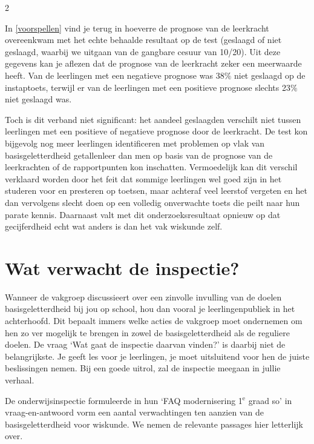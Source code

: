 \begin{multicols}{2}

In \autoref{voorspellen} vind je terug in hoeverre de prognose van de leerkracht overeenkwam met het echte behaalde resultaat op de test (geslaagd of niet geslaagd, waarbij we uitgaan van de gangbare cesuur van 10/20). Uit deze gegevens kan je aflezen dat de prognose van de leerkracht zeker een meerwaarde heeft. Van de leerlingen met een negatieve prognose was 38$\%$ niet geslaagd op de instaptoets, terwijl er van de leerlingen met een positieve prognose slechts 23$\%$ niet geslaagd was. 

Toch is dit verband niet significant: het aandeel geslaagden verschilt niet tussen leerlingen met een positieve of negatieve prognose door de leerkracht. De test kon bijgevolg nog meer leerlingen identificeren met problemen op vlak van basisgeletterdheid getallenleer dan men op basis van de prognose van de leerkrachten of de rapportpunten kon inschatten. Vermoedelijk kan dit verschil verklaard worden door het feit dat sommige leerlingen wel goed zijn in het studeren voor en presteren op toetsen, maar achteraf veel leerstof vergeten en het dan vervolgens slecht doen op een volledig onverwachte toets die peilt naar hun parate kennis. Daarnaast valt met dit onderzoeksresultaat opnieuw op dat gecijferdheid echt wat anders is dan het vak wiskunde zelf.

\section{Wat verwacht de inspectie?}
Wanneer de vakgroep discussieert over een zinvolle invulling van de doelen basisgeletterdheid bij jou op school, hou dan vooral je leerlingenpubliek in het achterhoofd. Dit bepaalt immers welke acties de vakgroep moet ondernemen om hen zo ver mogelijk te brengen in zowel de basisgeletterdheid als de reguliere doelen. De vraag `Wat gaat de inspectie daarvan vinden?' is daarbij niet de belangrijkste. Je geeft les voor je leerlingen, je moet uitsluitend voor hen de juiste beslissingen nemen. Bij een goede uitrol, zal de inspectie meegaan in jullie verhaal. 

De onderwijsinspectie formuleerde in hun `FAQ modernisering 1$^\text{e}$ graad so' in vraag-en-antwoord vorm een aantal verwachtingen ten aanzien van de basisgeletterdheid voor wiskunde. We nemen de relevante passages hier letterlijk over.


\end{multicols}
